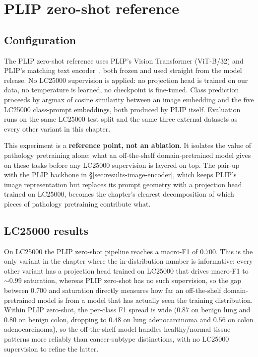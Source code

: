 \section{PLIP zero-shot reference}
\label{sec:results-plip-zeroshot}

\subsection{Configuration}

The PLIP zero-shot reference uses PLIP's Vision Transformer (ViT-B/32) and PLIP's matching text encoder~\cite{huang2023plip}, both frozen and used straight from the model release. No LC25000 supervision is applied: no projection head is trained on our data, no temperature is learned, no checkpoint is fine-tuned. Class prediction proceeds by argmax of cosine similarity between an image embedding and the five LC25000 class-prompt embeddings, both produced by PLIP itself. Evaluation runs on the same LC25000 test split and the same three external datasets as every other variant in this chapter.

This experiment is a \textbf{reference point, not an ablation}. It isolates the value of pathology pretraining alone: what an off-the-shelf domain-pretrained model gives on these tasks before any LC25000 supervision is layered on top. The pair-up with the PLIP backbone in §\ref{sec:results-image-encoder}, which keeps PLIP's image representation but replaces its prompt geometry with a projection head trained on LC25000, becomes the chapter's clearest decomposition of which pieces of pathology pretraining contribute what.

\subsection{LC25000 results}

On LC25000 the PLIP zero-shot pipeline reaches a macro-F1 of $\mathbf{0.700}$. This is the only variant in the chapter where the in-distribution number is informative: every other variant has a projection head trained on LC25000 that drives macro-F1 to $\sim 0.99$ saturation, whereas PLIP zero-shot has no such supervision, so the gap between $0.700$ and saturation directly measures how far an off-the-shelf domain-pretrained model is from a model that has actually seen the training distribution. Within PLIP zero-shot, the per-class F1 spread is wide ($0.87$ on benign lung and $0.80$ on benign colon, dropping to $0.48$ on lung adenocarcinoma and $0.56$ on colon adenocarcinoma), so the off-the-shelf model handles healthy/normal tissue patterns more reliably than cancer-subtype distinctions, with no LC25000 supervision to refine the latter.

